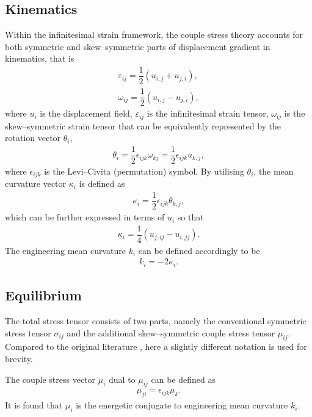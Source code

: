 \documentclass[3p,sort&compress,11pt,fleqn]{elsarticle}
\begin{document}
\subsection{Kinematics}
Within the infinitesimal strain framework, the couple stress theory \citep{Hadjesfandiari2011} accounts for both symmetric and skew--symmetric parts of displacement gradient in kinematics, that is
\begin{gather}\label{eq:varepsilon}
\varepsilon_{ij}=\dfrac{1}{2}\left(u_{i,j}+u_{j,i}\right),\\
\omega_{ij}=\dfrac{1}{2}\left(u_{i,j}-u_{j,i}\right),
\end{gather}
where $u_i$ is the displacement field, $\varepsilon_{ij}$ is the infinitesimal strain tensor, $\omega_{ij}$ is the skew--symmetric strain tensor that can be equivalently represented by the rotation vector $\theta_i$,
\begin{gather}\label{eq:theta}
\theta_i=\dfrac{1}{2}\epsilon_{ijk}\omega_{kj}=\dfrac{1}{2}\epsilon_{ijk}u_{k,j},
\end{gather}
where $\epsilon_{ijk}$ is the Levi--Civita (permutation) symbol. By utilising $\theta_i$, the mean curvature vector $\kappa_i$ is defined as
\begin{gather}\label{eq:kappa}
\kappa_i=\dfrac{1}{2}\epsilon_{ijk}\theta_{k,j},
\end{gather}
which can be further expressed in terms of $u_i$ so that
\begin{gather}
\kappa_i=\dfrac{1}{4}\left(u_{j,ij}-u_{i,jj}\right).
\end{gather}
The engineering mean curvature $k_i$ can be defined accordingly to be
\begin{gather}
k_i=-2\kappa_i.
\end{gather}
\subsection{Equilibrium}
The total stress tensor consists of two parts, namely the conventional symmetric stress tensor $\sigma_{ij}$ and the additional skew--symmetric couple stress tensor $\mu_{ij}$. Compared to the original literature \citep{Hadjesfandiari2011}, here a slightly different notation is used for brevity.

The couple stress vector $\mu_i$ dual to $\mu_{ij}$ can be defined as
\begin{gather}
\mu_{ji}=\epsilon_{ijk}\mu_k.
\end{gather}
It is found that $\mu_i$ is the energetic conjugate to engineering mean curvature $k_i$.
\end{document}
